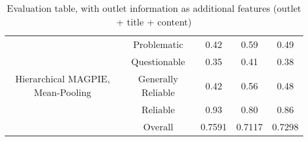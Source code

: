 \begin{table}[htbp]
\begin{tabular}{| c | c | c | c | c |}
        \multirow{5}{*}{Hierarchical MAGPIE, Mean-Pooling} & Problematic        & 0.42               & 0.59            & 0.49            \\
                                                           & Questionable       & 0.35               & 0.41            & 0.38            \\
                                                           & Generally Reliable & 0.42               & 0.56            & 0.48            \\
                                                           & Reliable           & 0.93               & 0.80            & 0.86            \\\cline{2-5}
                                                           & Overall            & 0.7591             & 0.7117          & 0.7298          \\
        \hline
    \end{tabular}
    \caption{Evaluation table, with outlet information as additional features (outlet + title + content)}
    \label{table:eval-outlet}
\end{table}

